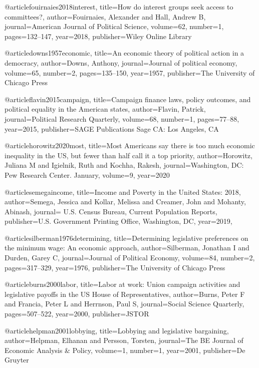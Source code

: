 @article{fouirnaies2018interest,
  title={How do interest groups seek access to committees?},
  author={Fouirnaies, Alexander and Hall, Andrew B},
  journal={American Journal of Political Science},
  volume={62},
  number={1},
  pages={132--147},
  year={2018},
  publisher={Wiley Online Library}
}

@article{downs1957economic,
  title={An economic theory of political action in a democracy},
  author={Downs, Anthony},
  journal={Journal of political economy},
  volume={65},
  number={2},
  pages={135--150},
  year={1957},
  publisher={The University of Chicago Press}
}

@article{flavin2015campaign,
  title={Campaign finance laws, policy outcomes, and political equality in the American states},
  author={Flavin, Patrick},
  journal={Political Research Quarterly},
  volume={68},
  number={1},
  pages={77--88},
  year={2015},
  publisher={SAGE Publications Sage CA: Los Angeles, CA}
}

@article{horowitz2020most,
  title={Most Americans say there is too much economic inequality in the US, but fewer than half call it a top priority},
  author={Horowitz, Juliana M and Igielnik, Ruth and Kochha, Rakesh},
  journal={Washington, DC: Pew Research Center. January},
  volume={9},
  year={2020}
}

@article{semegaincome,
  title={Income and Poverty in the United States: 2018},
  author={Semega, Jessica and Kollar, Melissa and Creamer, John and Mohanty, Abinash},
  journal={ U.S. Census Bureau, Current Population Reports},
  publisher={U.S. Government Printing Office, Washington, DC},
  year={2019},
}

@article{silberman1976determining,
  title={Determining legislative preferences on the minimum wage: An economic approach},
  author={Silberman, Jonathan I and Durden, Garey C},
  journal={Journal of Political Economy},
  volume={84},
  number={2},
  pages={317--329},
  year={1976},
  publisher={The University of Chicago Press}
}

@article{burns2000labor,
  title={Labor at work: Union campaign activities and legislative payoffs in the US House of Representatives},
  author={Burns, Peter F and Francia, Peter L and Herrnson, Paul S},
  journal={Social Science Quarterly},
  pages={507--522},
  year={2000},
  publisher={JSTOR}
}

@article{helpman2001lobbying,
  title={Lobbying and legislative bargaining},
  author={Helpman, Elhanan and Persson, Torsten},
  journal={The BE Journal of Economic Analysis \& Policy},
  volume={1},
  number={1},
  year={2001},
  publisher={De Gruyter}
}


